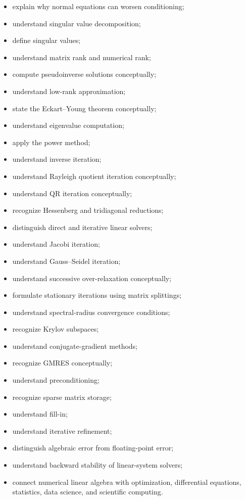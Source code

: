 {\begin{itemize}
    \item explain why normal equations can worsen conditioning;
    \item understand singular value decomposition;
    \item define singular values;
    \item understand matrix rank and numerical rank;
    \item compute pseudoinverse solutions conceptually;
    \item understand low-rank approximation;
    \item state the Eckart--Young theorem conceptually;
    \item understand eigenvalue computation;
    \item apply the power method;
    \item understand inverse iteration;
    \item understand Rayleigh quotient iteration conceptually;
    \item understand QR iteration conceptually;
    \item recognize Hessenberg and tridiagonal reductions;
    \item distinguish direct and iterative linear solvers;
    \item understand Jacobi iteration;
    \item understand Gauss--Seidel iteration;
    \item understand successive over-relaxation conceptually;
    \item formulate stationary iterations using matrix splittings;
    \item understand spectral-radius convergence conditions;
    \item recognize Krylov subspaces;
    \item understand conjugate-gradient methods;
    \item recognize GMRES conceptually;
    \item understand preconditioning;
    \item recognize sparse matrix storage;
    \item understand fill-in;
    \item understand iterative refinement;
    \item distinguish algebraic error from floating-point error;
    \item understand backward stability of linear-system solvers;
    \item connect numerical linear algebra with optimization,
          differential equations, statistics, data science, and
          scientific computing.
\end{itemize}
}

